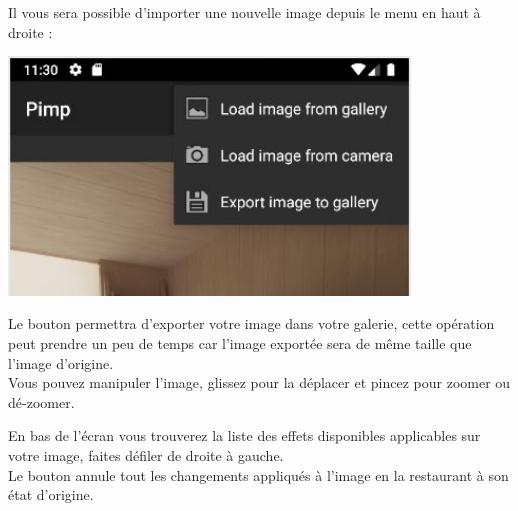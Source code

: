 \begin{center}
\begin{minipage}{.48\textwidth}
    \end{minipage}
    \begin{minipage}{.48\textwidth}
        Il vous sera possible d'importer une nouvelle image depuis le menu {\faChevronCircleDown}  en haut à droite :
        \begin{center}
        \includegraphics[width=0.8\textwidth]{report_src/app_manual/3dot_button_preview.JPG}
        \end{center}    

        Le bouton {\faSave} permettra d'exporter votre image dans votre galerie, cette opération peut prendre un peu de temps car l'image exportée sera de même taille que l'image d'origine.
        \\

        Vous pouvez manipuler l'image, glissez pour la déplacer et pincez pour zoomer ou dé-zoomer.
    \end{minipage}
\end{center}

En bas de l'écran vous trouverez la liste des effets disponibles applicables sur votre image, faites défiler de droite à gauche.
\\

Le bouton {\faMailReply} annule tout les changements appliqués à l'image en la restaurant à son état d'origine.
\clearpage

